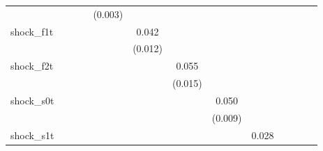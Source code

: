 {\begin{tabular}{l*{12}{c}}
            &                     &                     &                     &     (0.003)         &                     &                     &                     &                     &                     &                     &                     &                     \\
\addlinespace
shock\_f1t   &                     &                     &                     &                     &       0.042\sym{***}&                     &                     &                     &                     &                     &                     &                     \\
            &                     &                     &                     &                     &     (0.012)         &                     &                     &                     &                     &                     &                     &                     \\
\addlinespace
shock\_f2t   &                     &                     &                     &                     &                     &       0.055\sym{***}&                     &                     &                     &                     &                     &                     \\
            &                     &                     &                     &                     &                     &     (0.015)         &                     &                     &                     &                     &                     &                     \\
\addlinespace
shock\_s0t   &                     &                     &                     &                     &                     &                     &       0.050\sym{***}&                     &                     &                     &                     &                     \\
            &                     &                     &                     &                     &                     &                     &     (0.009)         &                     &                     &                     &                     &                     \\
\addlinespace
shock\_s1t   &                     &                     &                     &                     &                     &                     &                     &       0.028\sym{**} &                     &                     &                     &                     \\

\end{tabular}}
